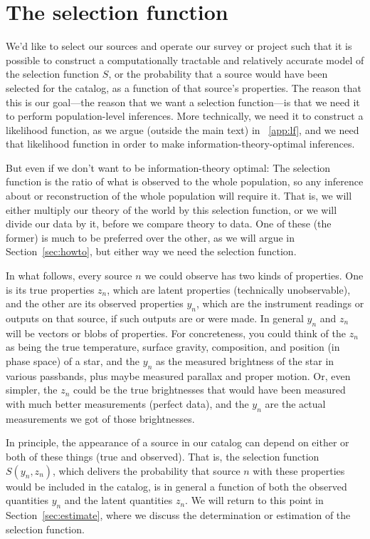 \documentclass[modern]{aastex62}
\newcommand{\sectionname}{Section}
\begin{document}
\section{The selection function}\label{sec:sf}

We'd like to select our sources and operate our survey or project such
that it is possible to construct a computationally tractable and
relatively accurate model of the selection function $S$, or the
probability that a source would have been selected for the catalog, as
a function of that source's properties.
The reason that this is our goal---the reason that we want a selection
function---is that we need it to perform population-level inferences.
More technically, we need it to construct a likelihood function, as we
argue (outside the main text)
in \appendixname~\ref{app:lf}, and we need that likelihood
function in order to make information-theory-optimal inferences.

But even if we don't want to be information-theory optimal: The
selection function is the ratio of what is observed to the whole
population, so any inference about or reconstruction of the whole
population will require it.
That is, we will either multiply our theory of the world by this
selection function, or we will divide our data by it, before we
compare theory to data.
One of these (the former) is much to be preferred over the other, as
we will argue in \sectionname~\ref{sec:howto}, but either way we
need the selection function.

In what follows, every source $n$ we could observe has two kinds of
properties.
One is its true properties $z_n$, which are latent
properties (technically unobservable), and the other are its observed
properties $y_n$, which are the instrument readings or outputs on that
source, if such outputs are or were made.
In general $y_n$ and $z_n$ will be vectors or blobs of properties.
For concreteness, you could think of the $z_n$ as being the true
temperature, surface gravity, composition, and position (in phase
space) of a star, and the $y_n$ as the measured brightness of the star
in various passbands, plus maybe measured parallax and proper motion.
Or, even simpler, the $z_n$ could be the true brightnesses that would
have been measured with much better measurements (perfect data), and
the $y_n$ are the actual measurements we got of those brightnesses.

In principle, the appearance of a source in our catalog can depend
on either or both of these things (true and observed).
That is, the selection function $S(y_n, z_n)$, which delivers the
probability that source $n$ with these properties would be included in
the catalog, is in general a function of both the observed quantities
$y_n$ and the latent quantities $z_n$.
We will return to this point in \sectionname~\ref{sec:estimate},
where we discuss the determination or estimation of the selection
function.
\end{document}
